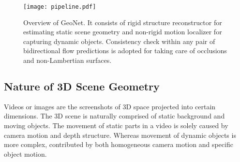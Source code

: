 \documentclass[10pt,twocolumn,letterpaper]{article}
\newcommand{\jpshi}[1]{{{\color{blue} Jianping: #1}}}
\begin{document}
\begin{figure*}[t]
\begin{center}
   \texttt{[image: pipeline.pdf]}
\end{center}
\vspace{-1ex}
   \caption{Overview of GeoNet. It consists of rigid structure reconstructor for estimating static scene geometry and non-rigid motion localizer for capturing dynamic objects.
   Consistency check within any pair of bidirectional flow predictions is adopted for taking care of occlusions and non-Lambertian surfaces.} %
   \vspace{-2ex}
\label{fig::pipeline}
\end{figure*}\subsection{Nature of 3D Scene Geometry}\label{sec::3dscene}%
Videos or images are the screenshots of 3D space projected into certain dimensions. The 3D scene is naturally comprised of static background and moving objects. The movement of static parts in a video is solely caused by camera motion and depth structure. Whereas movement of dynamic objects is more complex, contributed by both homogeneous camera motion and specific object motion.
\end{document}
